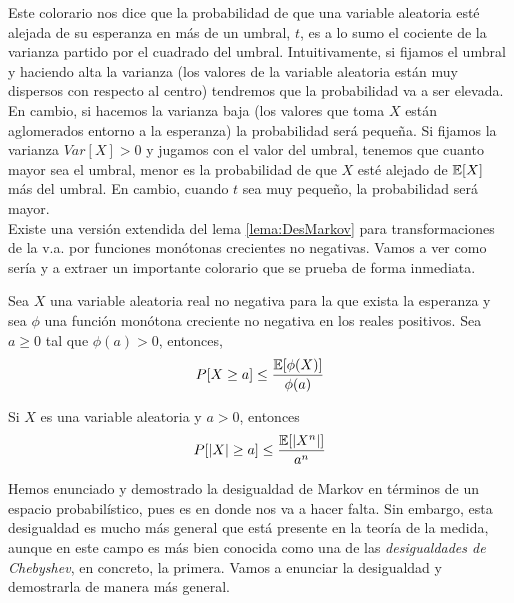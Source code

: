     Este colorario nos dice que la probabilidad de que una variable aleatoria esté alejada de su esperanza en más de un umbral, $t$, es a lo sumo el cociente de la varianza partido por el cuadrado del umbral. Intuitivamente, si fijamos el umbral y haciendo alta la varianza  (los valores de la variable aleatoria están muy dispersos con respecto al centro) tendremos que la probabilidad va a ser elevada. En cambio, si hacemos la varianza baja (los valores que toma $X$ están aglomerados entorno a la esperanza) la probabilidad será pequeña. Si fijamos la varianza $Var[X] > 0$ y jugamos con el valor del umbral, tenemos que cuanto mayor sea el umbral, menor es la probabilidad de que $X$ esté alejado de $\mathbb{E}[X]$ más del umbral. En cambio, cuando $t$ sea muy pequeño, la probabilidad será mayor. \\ 
    
    
    Existe una versión extendida del lema \ref{lema:DesMarkov} para transformaciones de la v.a. por funciones monótonas crecientes no negativas. Vamos a ver como sería y a extraer un importante colorario que se prueba de forma inmediata. \\
    
    \begin{lema}
    Sea $X$ una variable aleatoria real no negativa para la que exista la esperanza y sea $\phi$ una función monótona creciente no negativa en los reales positivos. Sea $a \geq 0$ tal que $\phi(a) > 0$, entonces,
    \begin{equation}
        P[X\geq a] \leq \frac{\mathbb{E}[\phi(X)]}{\phi(a)}
    \end{equation}
    
    \end{lema}
    
    \begin{corolario}
    Si $X$ es una variable aleatoria y $a > 0$, entonces
    \begin{equation}
        P[|X| \geq a] \leq \frac{\mathbb{E}[|X^n|]}{a^n}
    \end{equation}
    \end{corolario}
    
    
    Hemos enunciado y demostrado la desigualdad de Markov en términos de un espacio probabilístico, pues es en donde nos va a hacer falta. Sin embargo, esta desigualdad es mucho más general que está presente en la teoría de la medida, aunque en este campo es más bien conocida como una de las \textit{desigualdades de Chebyshev}, en concreto, la primera. Vamos a enunciar la desigualdad y demostrarla de manera más general.
    
